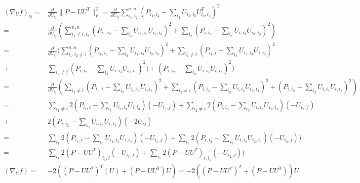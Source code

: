 \documentclass{report}
\begin{document}
   	\begin{align*}
   	 (\nabla_Uf)_{ij}  
   	 =& \frac{\partial}{\partial U_{ij}} \|P - UU^T\|^2_{F} = \frac{\partial}{\partial U_{ij}} \sum_{i_1,i_2}^{n,n}
   	   (P_{i_1,i_2} - \sum_{i_3}U_{i_1,i_3}U^T_{i_3,i_2})^2 \\
   	 =& \frac{\partial}{\partial U_{ij}}(
   	   \sum_{i_1 \neq i,i_2}^{n,n}
   	   (P_{i_1,i_2} - \sum_{i_3}U_{i_1,i_3}U_{i_2,i_3})^2
   	   + \sum_{i_2}(P_{i,i_2} - \sum_{i_3}U_{i,i_3}U_{i_2,i_3})^2)\\
   	 =& \frac{\partial}{\partial U_{ij}}(
   	 \sum_{i_1,i_2 \neq i}^{n,n}
   	 (P_{i_1,i_2} - \sum_{i_3}U_{i_1,i_3}U_{i_2,i_3})^2
   	 + \sum_{i_1 \neq i}(P_{i_1,i} - \sum_{i_3}U_{i_1,i_3}U_{i,i_3})^2\\
   	 +& \sum_{i_2 \neq i}(P_{i,i_2} - \sum_{i_3}U_{i,i_3}U_{i_2,i_3})^2) 
   	 + (P_{i,i_2} - \sum_{i_3}U_{i,i_3}U_{i,i_3})^2)\\
   	 =& \frac{\partial}{\partial U_{ij}}(\sum_{i_1 \neq i}(P_{i_1,i} - \sum_{i_3}U_{i_1,i_3}U_{i,i_3})^2
   	 + \sum_{i_2 \neq i}(P_{i,i_2} - \sum_{i_3}U_{i,i_3}U_{i_2,i_3})^2 
   	 + (P_{i,i_2} - \sum_{i_3}U_{i,i_3}U_{i,i_3})^2)\\
   	 =& \sum_{i_1 \neq i}2(P_{i_1,i} - \sum_{i_3}U_{i_1,i_3}U_{i,i_3})(-U_{i_1,j})
   	 + \sum_{i_2 \neq i}2(P_{i,i_2} - \sum_{i_3}U_{i,i_3}U_{i_2,i_3})(-U_{i_2,j}) \\
   	 +& 2(P_{i,i_2} - \sum_{i_3}U_{i,i_3}U_{i,i_3})(-2U_{ij}) \\   	 
   	 =& \sum_{i_1}2(P_{i_1,i} - \sum_{i_3}U_{i_1,i_3}U_{i,i_3})(-U_{i_1,j})
   	 + \sum_{i_2}2(P_{i,i_2} - \sum_{i_3}U_{i,i_3}U_{i_2,i_3})(-U_{i_2,j})) \\
   	 =& \sum_{i_1}2(P - UU^T)_{i_1,i}(-U_{i_1,j})
   	 + \sum_{i_1}2(P - UU^T)_{i,i_1}(-U_{i_1,j})) \\ 
   	 (\nabla_U f)=& -2((P - UU^T)^T(U) + (P - UU^T)U) = -2((P-UU^T)^T + (P - UU^T) )U
   	\end{align*}
   	
\end{document}

